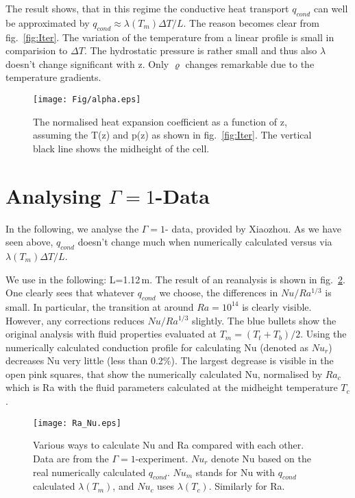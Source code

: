 \documentclass[11pt]{article}
\begin{document}
The result shows, that in this regime the conductive heat transport $q_{cond}$ can well be approximated by
$q_{cond}\approx \lambda (T_m)\Delta T/L$. The reason becomes clear from fig.~\ref{fig:Iter}. The variation of
the temperature from a linear profile is small in comparision to $\Delta T$. The hydrostatic pressure is
rather small and thus also $\lambda$ doesn't change significant with z. Only $\varrho$ changes remarkable due
to the temperature gradients.

\begin{figure}[htpb]
\centering
\texttt{[image: Fig/alpha.eps]}
\caption{The normalised heat expansion coefficient as a function of z, assuming the T(z) and p(z) as shown in
fig.~\ref{fig:Iter}. The vertical black line shows the midheight of the cell.}
\label{fig:alpha}
\end{figure}

\section{Analysing $\Gamma=1$-Data}

In the following, we analyse the $\Gamma=1$- data, provided by Xiaozhou.
As we have seen above, $q_{cond}$ doesn't change much when numerically calculated versus via
$\lambda(T_m)\Delta T/L$.

We use in the following: L=1.12\,m. The result of an reanalysis is shown in fig.~\ref{fig:Ra_Nu}. One clearly
sees that whatever $q_{cond}$ we choose, the differences in $Nu/Ra^{1/3}$ is small. In particular, the
transition at around $Ra=10^{14}$ is clearly visible. However, any corrections reduces $Nu/Ra^{1/3}$ slightly.
The blue bullets show the original analysis with fluid properties evaluated at $T_m=(T_t+T_b)/2$. Using the
numerically calculated conduction profile for calculating Nu (denoted as $Nu_r$) decreases Nu very little
(less than 0.2\%). The largest degrease is visible in the open pink squares, that show the numerically
calculated Nu, normalised by $Ra_c$ which is Ra with the fluid parameters calculated at the midheight
temperature $T_c$.

\begin{figure}[htpb]
\centering
\texttt{[image: Ra\_Nu.eps]}
\caption{Various ways to calculate Nu and Ra compared with each other. Data are from the
$\Gamma=1$-experiment. $Nu_r$ denote Nu based on the real numerically calculated $q_{cond}$. $Nu_m$ stands for
Nu with $q_{cond}$ calculated $\lambda(T_m)$, and $Nu_c$ uses $\lambda(T_c)$. Similarly for Ra.}
\label{fig:Ra_Nu}
\end{figure}




\end{document}
